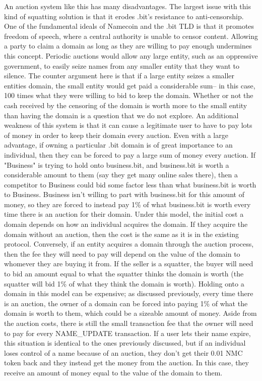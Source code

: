     An auction system like this has many disadvantages. The largest issue with this kind of squatting solution is that it erodes .bit's resistance to anti-censorship. One of the fundamental ideals of Namecoin and the .bit TLD is that it promotes freedom of speech, where a central authority is unable to censor content. Allowing a party to claim a domain as long as they are willing to pay enough undermines this concept. Periodic auctions would allow any large entity, such as an oppressive government, to easily seize names from any smaller entity that they want to silence. The counter argument here is that if a large entity seizes a smaller entities domain, the small entity would get paid a considerable sum-- in this case, 100 times what they were willing to bid to keep the domain. Whether or not the cash received by the censoring of the domain is worth more to the small entity than having the domain is a question that we do not explore.  An additional weakness of this system is that it can cause a legitimate user to have to pay lots of money in order to keep their domain every auction. Even with a large advantage, if owning a particular .bit domain is of great importance to an individual, then they can be forced to pay a large sum of money every auction. If "Business" is trying to hold onto business.bit, and business.bit is worth a considerable amount to them (say they get many online sales there), then a competitor to Business could bid some factor  less than what business.bit is worth to Business. Business isn't willing to part with business.bit for this amount of money, so they are forced to instead pay 1\% of what business.bit is worth every time there is an auction for their domain.
    Under this model, the initial cost a domain depends on how an individual acquires the domain. If they acquire the domain without an auction, then the cost is the same as it is in the existing protocol. Conversely, if an entity acquires a domain through the auction process, then the fee they will need to pay will depend on the value of the domain to whomever they are buying it from. If the seller is a squatter, the buyer will need to bid an amount equal to what the squatter thinks the domain is worth (the squatter will bid 1\% of what they think the domain is worth). Holding onto a domain in this model can be expensive; as discussed previously, every time there is an auction, the owner of a domain can be forced into paying 1\% of what the domain is worth to them, which could be a sizeable amount of money. Aside from the auction costs, there is still the small transaction fee that the owner will need to pay for every NAME\_UPDATE transaction. If a user lets their name expire, this situation is identical to the ones previously discussed, but if an individual loses control of a name because of an auction, they don't get their 0.01 NMC token back and they instead get the money from the auction. In this case, they receive an amount of money equal to the value of the domain to them. 

